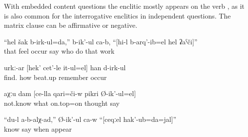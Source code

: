 With embedded content questions the enclitic mostly appears on the verb , as it is also common for the interrogative enclitics in independent questions. The matrix clause can be affirmative or negative.
%
\begin{exe}
	\ex	\label{ex:I suspect, says the fox, whose work this was}
	\gll	``hel	šak	b-irk-ul=da,''	b-ik'-ul	ca-b,	``[hi-l	b-arq'-ib=el	hel	ʡaˁči]''\\
		that	feel	occur	say		who	do	that	work\\
	\glt	{}

	\ex	\label{ex:(He) probably remembers how he beat her up@18}
	\gll	urkː-ar	[hek'	cet'-le	it-ul=el]	han	d-irk-ul\\
		find.		how	beat.up	remember	occur\\
	\glt	{}

	\ex	\label{ex:I don't know about what he is thinking@22}
	\gll	aχːu	dam	[ce-lla	qari=či-w	pikri	Ø-ik'-ul=el]\\
		not.know		what	on.top=on	thought	say\\
	\glt	{}

	\ex	\label{ex:‎The horse said, I do not know when I was born}
	\gll	``du-l	a-b-alχ-ad,''	Ø-ik'-ul	ca-w	``[ceqːel	hak'-ub=da=jal]''\\
			know	say		when	appear\\
	\glt	{}
\end{exe}

